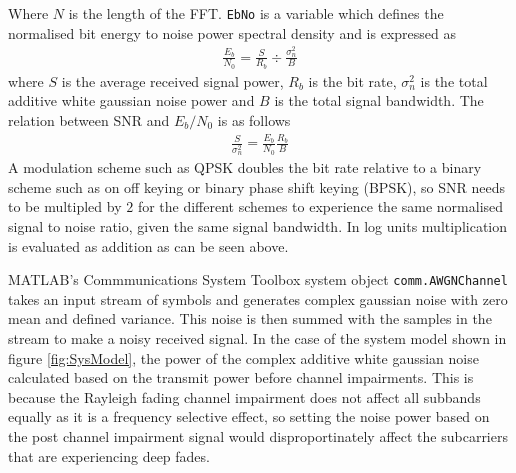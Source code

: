 Where $N$ is the length of the FFT. \texttt{EbNo} is a %
variable which defines the normalised bit energy %
to noise power spectral density and is %
expressed as \cite{Sklar01}
\begin{align}
	\frac{E_b}{N_0} = \frac{S}{R_b} \div 
	\frac{\sigma_n^{2}}{B}
\end{align}
where $S$ is the average received signal power, %
$R_b$ is the bit rate, $\sigma_n^{2}$ is the %
total additive white gaussian noise power and %
$B$ is the total signal bandwidth. The relation %
between SNR and $E_b/N_0$ is as follows
\begin{align}
	\frac{S}{\sigma_n^{2}} = \frac{E_b}{N_0}
	\frac{R_b}{B}
\end{align}
A modulation scheme such as QPSK doubles the bit %
rate relative to a binary scheme such as on off %
keying or binary phase shift keying (BPSK), so %
SNR needs to be multipled by $2$ for the different %
schemes to experience the same normalised %
signal to noise ratio, given the same signal bandwidth. %
In log units multiplication %
is evaluated as addition as can be seen above.

MATLAB's Commmunications System Toolbox system object %
\texttt{comm.AWGNChannel} \cite{AWGNChannel} takes an %
input stream of %
symbols and generates complex gaussian noise with %
zero mean and defined variance. This noise is then %
summed with the samples in the stream to make a noisy %
received signal. In the case of the system model shown in %
figure \ref{fig:SysModel}, the power of the complex %
additive white gaussian noise calculated based on the transmit %
power before channel impairments. This is because the Rayleigh %
fading channel impairment does not affect all subbands equally as %
it is a frequency selective effect, so setting the noise power based %
on the post channel impairment signal would disproportinately affect %
the subcarriers that are experiencing deep fades.

